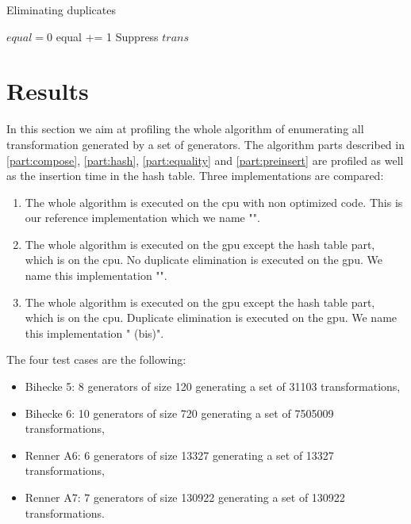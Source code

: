{\begin{algorithm}
\caption{Eliminating duplicates}
\label{algo:preinsert}
\begin{algorithmic}
\STATE $equal = 0$
\STATE equal += 1
\ENDIF
\ENDFOR
{}
\STATE Suppress $trans$
\ENDIF
\ENDIF
\ENDFOR
\ENDFOR
\end{algorithmic}
\end{algorithm}


\section{Results}
\label{part:results}
In this section we aim at profiling the whole algorithm of enumerating all transformation generated by a set of generators. The algorithm parts described in \autoref{part:compose}, \autoref{part:hash}, \autoref{part:equality} and \autoref{part:preinsert} are profiled as well as the insertion time in the hash table.
Three implementations are compared:
\begin{enumerate}
\item The whole algorithm is executed on the \gls{cpu} with non optimized code. This is our reference implementation which we name "". 
\item The whole algorithm is executed on the \gls{gpu} except the hash table part, which is on the \gls{cpu}. No duplicate elimination is executed on the \gls{gpu}.
We name this implementation "".
\item The whole algorithm is executed on the \gls{gpu} except the hash table part, which is on the \gls{cpu}. Duplicate elimination is executed on the \gls{gpu}.
We name this implementation " (bis)".
\end{enumerate}
The four test cases are the following:
\begin{itemize}
\item Bihecke 5: 8 generators of size 120 generating a set of 31103 transformations,
\item Bihecke 6: 10 generators of size 720 generating a set of 7505009 transformations,
\item Renner A6: 6 generators of size 13327 generating a set of 13327 transformations,
\item Renner A7: 7 generators of size 130922 generating a set of 130922 transformations.
\end{itemize}


}
